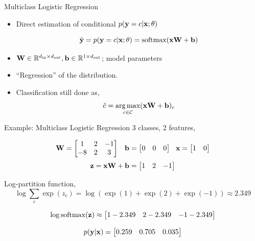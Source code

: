 \documentclass{beamer}
\begin{document}
\begin{frame}{Multiclass Logistic Regression}
  \begin{itemize}
  \item Direct estimation of conditional $p(\mathbf{y} =c | \mathbf{x}; \theta)$
  
    \[\hat{\boldy} =  p(\boldy =c | \boldx; \theta) =  \softmax(\boldx \boldW + \boldb) \] 
  \item $\mathbf{W} \in \mathbb{R}^{{d_{\mathrm{in}}} \times {d_{\mathrm{out}}}}, \mathbf{b} \in \mathbb{R}^{1 \times {d_{\mathrm{out}}}}$; model parameters

  \item ``Regression'' of the distribution.
  \item Classification still done as,
    \[ \hat{c} =  \argmax_{c \in \mcC} (\boldx \boldW + \boldb)_c  \]

  \end{itemize}





\end{frame}

\begin{frame}{Example: Multiclass Logistic Regression}
  3 classes, 2 features, 
  
  \begin{eqnarray*}
    \mathbf{W} = \begin{bmatrix} 1  & 2 & -1 \\ -8 & 2 & 3 \\ \end{bmatrix}  &&   \mathbf{b} = \begin{bmatrix} 0  & 0  & 0\\ \end{bmatrix} \ \  \mathbf{x} = \begin{bmatrix} 1  & 0 \\ \end{bmatrix} \\
  \end{eqnarray*}
  \[ \mathbf{z} = \mathbf{x} \mathbf{W} + \mathbf{b} = \begin{bmatrix} 1 & 2 & -1 \\ \end{bmatrix} \]

  Log-partition function,  
  \[ \log \sum_c \exp(z_c) = \log ( \exp(1)  +  \exp(2) + \exp(-1) ) \approx 2.349 \] 

  \[\log \softmax(\boldz) \approx \begin{bmatrix}  1 - 2.349   &  2- 2.349 & -1 - 2.349 \\ \end{bmatrix}  \] 

  \[p(\mathbf{y}| \mathbf{x}) = \begin{bmatrix} 0.259 & 0.705 & 0.035 \end{bmatrix}   \]
\end{frame}
\end{document}
